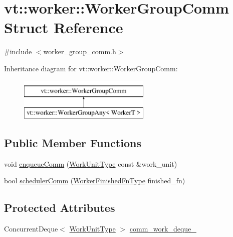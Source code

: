 \hypertarget{structvt_1_1worker_1_1_worker_group_comm}{}\section{vt\+:\+:worker\+:\+:Worker\+Group\+Comm Struct Reference}
\label{structvt_1_1worker_1_1_worker_group_comm}


{\ttfamily \#include $<$worker\+\_\+group\+\_\+comm.\+h$>$}

Inheritance diagram for vt\+:\+:worker\+:\+:Worker\+Group\+Comm\+:\begin{figure}[H]
\begin{center}
\leavevmode
\includegraphics[height=2.000000cm]{structvt_1_1worker_1_1_worker_group_comm}
\end{center}
\end{figure}
\subsection*{Public Member Functions}
\begin{DoxyCompactItemize}
\item 
void \hyperlink{structvt_1_1worker_1_1_worker_group_comm_a7dbfe6e9f85f97ec64756d565200e4f9}{enqueue\+Comm} (\hyperlink{namespacevt_1_1worker_a59d2fcdafa81fc0af7f921a258e42202}{Work\+Unit\+Type} const \&work\+\_\+unit)
\item 
bool \hyperlink{structvt_1_1worker_1_1_worker_group_comm_a2801e1bc38337507fd6f14ff8b439b84}{scheduler\+Comm} (\hyperlink{namespacevt_1_1worker_ae32a174a5348d27aafe73c2debea1a94}{Worker\+Finished\+Fn\+Type} finished\+\_\+fn)
\end{DoxyCompactItemize}
\subsection*{Protected Attributes}
\begin{DoxyCompactItemize}
\item 
Concurrent\+Deque$<$ \hyperlink{namespacevt_1_1worker_a59d2fcdafa81fc0af7f921a258e42202}{Work\+Unit\+Type} $>$ \hyperlink{structvt_1_1worker_1_1_worker_group_comm_af021d6e25f970f702c87cd374040a3cc}{comm\+\_\+work\+\_\+deque\+\_\+}
\end{DoxyCompactItemize}


